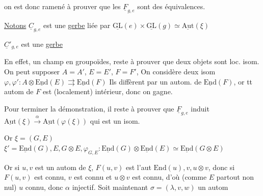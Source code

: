 on est donc ramené à prouver que les $\underline F_{g,e}$ sont des équivalences.

\uline{Notons} $\underline C_{g,e}$ est une \uline{gerbe}  liée par $\underline{\mathrm{GL}}(e)\times\underline{\mathrm{GL}}(g)\simeq\underline{\mathrm{Aut}}(\xi)$

 $\underline C'_{g,e}$ est une \uline{gerbe} 


En effet,  un champ en groupoïdes,  reste à prouver que
deux objets sont loc. isom. On peut supposer $A=A'$, $E=E'$, $F=F'$,
On considère deux isom $\varphi,\varphi':A\otimes\underline{\mathrm{End}}(E)\rightrightarrows\underline{\mathrm{End}}(F)$
Ils diffèrent par un autom.  de $\underline{\mathrm{End}}(F)$,  or tt autom
de $F$ est (localement) intérieur, donc on gagne. 

Pour terminer la démonstration, il reste à prouver
que $\underline F_{g,e}$ induit $\underline{\mathrm{Aut}}(\xi)\xrightarrow{\alpha}\underline{\mathrm{Aut}}(\varphi(\xi))$ qui est un isom.

Or $\xi=(G,E)$ $\xi'=\underline{\mathrm{End}}(G),E,G\otimes E,\varphi_{G,E}:\underline{\mathrm{End}}(G)\otimes\underline{\mathrm{End}}(E)\simeq\underline{\mathrm{End}}(G\otimes E)$

Or si $u,v$ est un autom de $\xi$, $F(u,v)$ est l'aut
$\mathrm{End}(u),v,u\otimes v$, donc si $F(u,v)$ est connu, $v$ est connu et
$u\otimes v$ est connu, d'où  (comme $E$ partout non nul) $u$ connu,
donc $\alpha$ injectif. Soit maintenant $\sigma=(\lambda,v,w)$ un autom

